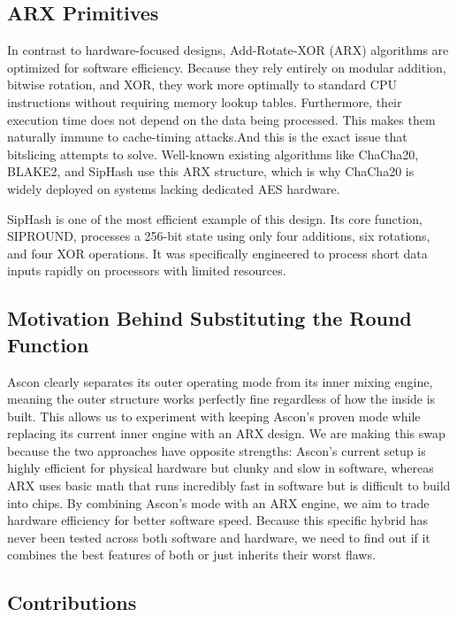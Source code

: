 \subsection{ARX Primitives}

In contrast to hardware-focused designs, Add-Rotate-XOR (ARX) algorithms are optimized for software efficiency. Because they rely entirely on modular addition, bitwise rotation, and XOR, they work more optimally  to standard CPU instructions without requiring memory lookup tables. Furthermore, their execution time does not depend on the data being processed. This makes them naturally immune to cache-timing attacks.And this is the exact issue that bitslicing attempts to solve. Well-known existing algorithms like ChaCha20, BLAKE2, and SipHash use this ARX structure, which is why ChaCha20 is widely deployed on systems lacking dedicated AES hardware.

SipHash is one of the most efficient example of this design. Its core function, SIPROUND, processes a 256-bit state using only four additions, six rotations, and four XOR operations. It was specifically engineered to process short data inputs rapidly on processors with limited resources.

\subsection{Motivation Behind Substituting the Round Function}

Ascon clearly separates its outer operating mode from its inner mixing engine, meaning the outer structure works perfectly fine regardless of how the inside is built. This allows us to experiment with keeping Ascon's proven mode while replacing its current inner engine with an ARX design. We are making this swap because the two approaches have opposite strengths: Ascon's current setup is highly efficient for physical hardware but clunky and slow in software, whereas ARX uses basic math that runs incredibly fast in software but is difficult to build into chips. By combining Ascon's mode with an ARX engine, we aim to trade hardware efficiency for better software speed. Because this specific hybrid has never been tested across both software and hardware, we need to find out if it combines the best features of both or just inherits their worst flaws.


\subsection{Contributions}

